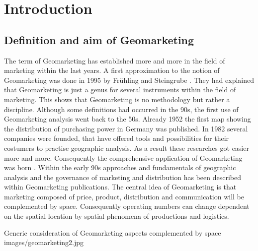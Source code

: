 \section{Introduction}

\subsection{Definition and aim of Geomarketing}
The term of Geomarketing has established more and more in the field of marketing within the last years.  A first approximation to the notion of Geomarketing was done in 1995 by  Frühling and Steingrube \cite{fruehling}. They had explained that Geomarketing is just a genus for several instruments within the field of marketing. This shows that Geomarketing is no methodology but rather a discipline. Although some definitions had occurred in the 90s, the first use of Geomarketing analysis went back to the 50s. Already 1952 the first map showing the distribution of purchasing power in Germany was published. In 1982 several companies were founded, that have offered tools and possibilities for their costumers to practise geographic analysis. As a result these researches got easier more and more. Consequently the comprehensive application of Geomarketing was born \cite{herter}. Within the early 90s approaches and fundamentals of geographic analysis and the governance of marketing and distribution has been described within Geomarketing publications. The central idea of Geomarketing is that marketing composed of price, product, distribution and communication will be complemented by space. Consequently operating numbers can change dependent on the spatial location by spatial phenomena of productions and logistics.   


\begin{figureOwn}{Generic consideration of Geomarketing aspects complemented by space \cite{herter}}{images/geomarketing2.jpg}\end{figureOwn}

